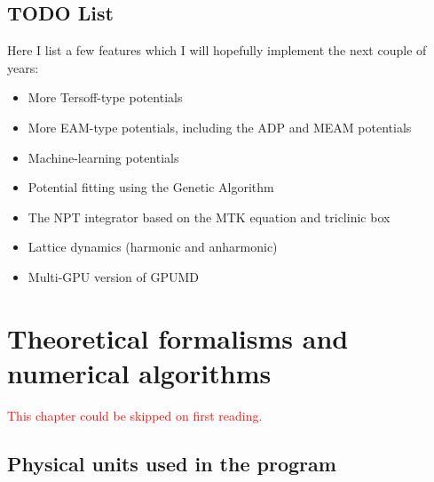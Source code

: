 \documentclass[12pt,a4paper]{report}
\begin{document}
\section{TODO List}

Here I list a few features which I will hopefully implement the next couple of years:
\begin{itemize}
\item More Tersoff-type potentials
\item More EAM-type potentials, including the ADP and MEAM potentials
\item Machine-learning potentials
\item Potential fitting using the Genetic Algorithm
\item The NPT integrator based on the MTK equation and triclinic box
\item Lattice dynamics (harmonic and anharmonic)
\item Multi-GPU version of GPUMD
\end{itemize}


\chapter{Theoretical formalisms and numerical algorithms\label{chapter:theory}}

\textcolor{red}{This chapter could be skipped on first reading.}

\section{Physical units used in the program}
\end{document}

